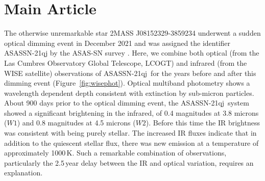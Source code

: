 \documentclass[sn-nature,oneside]{sn-jnl}%
\newcommand{\asas}{ASASSN-21qj}
\begin{document}

\maketitle


\section{Main Article}\label{sec1}

%
%
%
%
%
%
%
%
%
%

The otherwise unremarkable star 2MASS J08152329-3859234 underwent a sudden optical dimming event in December 2021 \cite{RizzoSmith21,RizzoSmith22} and was assigned the identifier \asas{} by the ASAS-SN survey \citep{shappee_man_2014,kochanek_all-sky_2017}.
%
Here, we combine both optical (from the Las Cumbres Observatory Global Telescope, LCOGT) and infrared (from the WISE satellite) observations of \asas~for the years before and after this dimming event (Figure~\ref{fig:wisephot}). 
%
Optical multiband photometry shows a wavelength dependent depth consistent with extinction by sub-micron particles.
%
About 900 days prior to the optical dimming event, the \asas~system showed a significant brightening in the infrared, of 0.4 magnitudes at 3.8 microns ($W1$) and 0.8 magnitudes at 4.5 microns ($W2$).
%
Before this time the IR brightness was consistent with being purely stellar.
%
The increased IR fluxes indicate that in addition to the quiescent stellar flux, there was new emission at a temperature of approximately 1000\,K.
%
Such a remarkable combination of observations, particularly the 2.5\,year delay between the IR and optical variation, requires an explanation.
\end{document}
